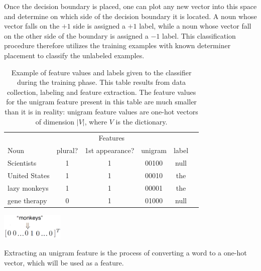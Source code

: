 \documentclass[justified, marginals=justified]{tufte-handout}
\begin{document}
Once the decision boundary is placed, one can plot any new vector into this space and determine on which side of the decision boundary it is located. A noun whose vector falls on the $+1$ side is assigned a $+1$ label, while a noun whose vector fall on the other side of the boundary is assigned a $-1$ label. This classification procedure therefore utilizes the training examples with known determiner placement to classify the unlabeled examples.


\begin{table}[h]
\begin{center}
\begin{tabular}{lccccc}
\toprule
 & \multicolumn{3}{c}{Features}  \\
\cmidrule(l){2-4} 
Noun & plural? & 1st appearance? & unigram & label\\
\midrule
Scientists & 1 & 1 & 00100 & null \\
United States & 1 & 1 & 00010 & the\\
lazy monkeys & 1 & 1 & 00001 & the\\
gene therapy & 0 & 1 & 01000 & null\\
\bottomrule
\end{tabular}
\end{center}
\caption{Example of feature values and labels given to the classifier during the training phase. This table results from data collection, labeling and feature extraction. The feature values for the unigram feature present in this table are much smaller than it is in reality: unigram feature values are one-hot vectors of dimension $|V|$, where $V$ is the dictionary.}
\label{tab:samples-for-classifiers}
\end{table}

\begin{marginfigure}[4cm]
\centering
  \includegraphics[width=3cm]{feature-extraction-unigram.png}
  \caption{Extracting an unigram feature is the process of converting a word to a one-hot vector, which will be used as a feature.}
  \label{fig:feature-extraction-unigram}
\end{marginfigure}
\end{document}

